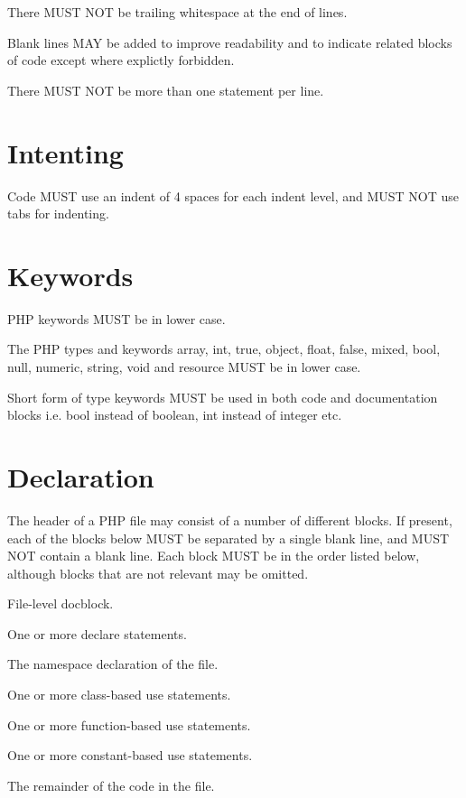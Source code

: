 There MUST NOT be trailing whitespace at the end of lines.

Blank lines MAY be added to improve readability and to indicate related blocks of code except where explictly forbidden.

There MUST NOT be more than one statement per line.


\section{Intenting}

Code MUST use an indent of 4 spaces for each indent level, and MUST NOT use tabs for indenting.



\section{Keywords}

PHP keywords MUST be in lower case.

The PHP types and keywords array, int, true, object, float, false, mixed, bool, null, numeric, string, void and resource MUST be in lower case.

Short form of type keywords MUST be used in both code and documentation blocks i.e. bool instead of boolean, int instead of integer etc.

\section{Declaration}

The header of a PHP file may consist of a number of different blocks. If present, each of the blocks below MUST be separated by a single blank line, and MUST NOT contain a blank line. Each block MUST be in the order listed below, although blocks that are not relevant may be omitted.

\begin{compactitem}
\item File-level docblock.
\item One or more declare statements.
\item The namespace declaration of the file.
\item One or more class-based use statements.
\item One or more function-based use statements.
\item One or more constant-based use statements.
\item The remainder of the code in the file.
\end{compactitem}

